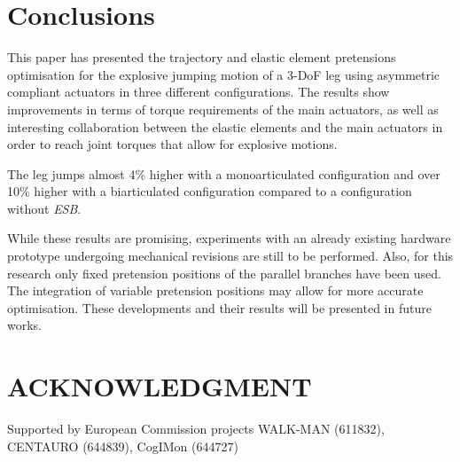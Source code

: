 \documentclass[letterpaper, 10 pt, conference]{ieeeconf}  %
\begin{document}
\section{Conclusions} \label{sec:conclusions} 
This paper has presented the trajectory and elastic element pretensions optimisation for the explosive jumping motion of a 3-DoF leg using asymmetric compliant actuators in three different configurations. The results show improvements in terms of torque requirements of the main actuators, as well as interesting collaboration between the elastic elements and the main actuators in order to reach joint torques that allow for explosive motions.

The leg jumps almost 4\% higher with a monoarticulated configuration and over 10\% higher with a biarticulated configuration compared to a configuration without \textit{ESB}.

While these results are promising, experiments with an already existing hardware prototype undergoing mechanical revisions are still to be performed. Also, for this research only fixed pretension positions of the parallel branches have been used. The integration of variable pretension positions may allow for more accurate optimisation. These developments and their results will be presented in future works.


\addtolength{\textheight}{-0cm}   %


\section{ACKNOWLEDGMENT}
Supported by European Commission projects WALK-MAN (611832), CENTAURO (644839), CogIMon (644727)



\end{document}
